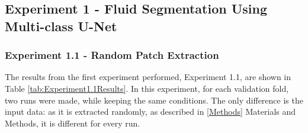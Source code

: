 \subsection{Experiment 1 - Fluid Segmentation Using Multi-class U-Net}

\subsubsection{Experiment 1.1 - Random Patch Extraction}

The results from the first experiment performed, Experiment 1.1, are shown in Table \ref{tab:Experiment1.1Results}. In this experiment, for each validation fold, two runs were made, while keeping the same conditions. The only difference is the input data: as it is extracted randomly, as described in \ref{Methods} Materials and Methods, it is different for every run. 

